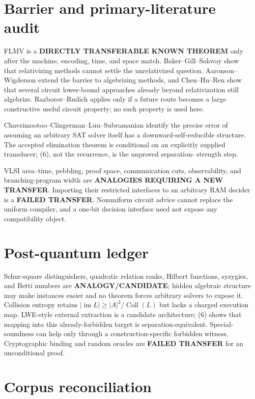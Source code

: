\documentclass[11pt]{article}
\begin{document}
\section{Barrier and primary-literature audit}

FLMV is a \textbf{DIRECTLY TRANSFERABLE KNOWN THEOREM} only after the machine,
encoding, time, and space match.  Baker--Gill--Solovay show that relativizing
methods cannot settle the unrelativized question.  Aaronson--Wigderson extend
the barrier to algebrizing methods, and Chen--Hu--Ren show that several circuit
lower-bound approaches already beyond relativization still algebrize.
Razborov--Rudich applies only if a future route becomes a large constructive
useful circuit property; no such property is used here.

Chavrimootoo--Clingerman--Luu--Subramanian identify the precise error of
assuming an arbitrary SAT solver itself has a downward-self-reducible
structure.  The accepted elimination theorem is conditional on an explicitly
supplied transducer; (6), not the recurrence, is the unproved separation-
strength step.

VLSI area--time, pebbling, proof space, communication cuts, observability, and
branching-program width are \textbf{ANALOGIES REQUIRING A NEW TRANSFER}.
Importing their restricted interfaces to an arbitrary RAM decider is a
\textbf{FAILED TRANSFER}.  Nonuniform circuit advice cannot replace the
uniform compiler, and a one-bit decision interface need not expose any
compatibility object.

\section{Post-quantum ledger}

Schur-square distinguishers, quadratic relation ranks, Hilbert functions,
syzygies, and Betti numbers are \textbf{ANALOGY/CANDIDATE}; hidden algebraic
structure may make instances easier and no theorem forces arbitrary solvers
to expose it.  Collision entropy retains
$|\operatorname{im}L|\ge|A|^2/\operatorname{Coll}(L)$ but lacks a charged
execution map.  LWE-style external extraction is a candidate architecture;
(6) shows that mapping into this already-forbidden target is
separation-equivalent.  Special-soundness can help only through a
construction-specific forbidden witness.  Cryptographic binding and random
oracles are \textbf{FAILED TRANSFER} for an unconditional proof.

\section{Corpus reconciliation}
\end{document}
